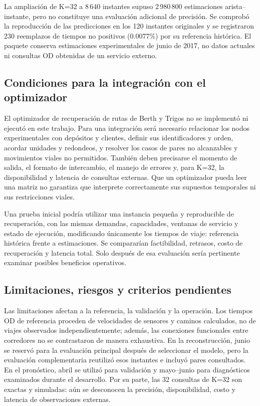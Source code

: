 \documentclass[letterpaper,11pt]{article}
\begin{document}
La ampliación de K=32 a 8\,640 instantes supuso 2\,980\,800 estimaciones arista--instante, pero no constituye una evaluación adicional de precisión. Se comprobó la reproducción de las predicciones en los 120 instantes originales y se registraron 230 reemplazos de tiempos no positivos (0.0077\%) por su referencia histórica. El paquete conserva estimaciones experimentales de junio de 2017, no datos actuales ni consultas OD obtenidas de un servicio externo.


\subsection{Condiciones para la integración con el optimizador}
El optimizador de recuperación de rutas de Berth y Trigos no se implementó ni ejecutó en este trabajo. Para una integración será necesario relacionar los nodos experimentales con depósitos y clientes, definir sus identificadores y orden, acordar unidades y redondeos, y resolver los casos de pares no alcanzables y movimientos viales no permitidos. También deben precisarse el momento de salida, el formato de intercambio, el manejo de errores y, para K=32, la disponibilidad y latencia de consultas externas. Que un optimizador pueda leer una matriz no garantiza que interprete correctamente sus supuestos temporales ni sus restricciones viales.

Una prueba inicial podría utilizar una instancia pequeña y reproducible de recuperación, con las mismas demandas, capacidades, ventanas de servicio y estado de ejecución, modificando únicamente los tiempos de viaje: referencia histórica frente a estimaciones. Se compararían factibilidad, retrasos, costo de recuperación y latencia total. Solo después de esa evaluación sería pertinente examinar posibles beneficios operativos.


\subsection{Limitaciones, riesgos y criterios pendientes}
Las limitaciones afectan a la referencia, la validación y la operación. Los tiempos OD de referencia proceden de velocidades de sensores y caminos calculados, no de viajes observados independientemente; además, las conexiones funcionales entre corredores no se contrastaron de manera exhaustiva. En la reconstrucción, junio se reservó para la evaluación principal después de seleccionar el modelo, pero la evaluación complementaria reutilizó esos instantes e incluyó pares consultados. En el pronóstico, abril se utilizó para validación y mayo--junio para diagnósticos examinados durante el desarrollo. Por su parte, las 32 consultas de K=32 son exactas y simuladas: aún se desconocen la precisión, disponibilidad, costo y latencia de observaciones externas.
\end{document}
